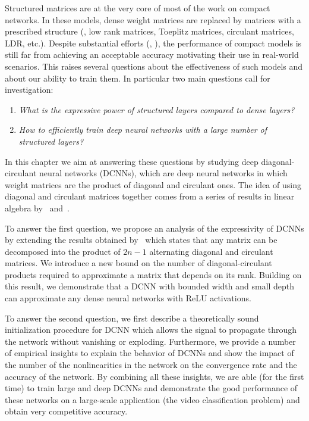 {Structured matrices are at the very core of most of the work on compact networks.
In these models, dense weight matrices are replaced by matrices with a prescribed structure (\eg, low rank matrices, Toeplitz matrices, circulant matrices, LDR, etc.).
Despite substantial efforts  (\eg, \citet{cheng2015exploration,moczulski2016acdc}), the performance of compact models is still far from achieving an acceptable accuracy motivating their use in real-world scenarios.
This raises several questions about the effectiveness of such models and about our ability to train them.
In particular two main questions call for investigation:
\begin{enumerate}
    \item \emph{What is the expressive power of structured layers compared to dense layers?}
    \item \emph{How to efficiently train deep neural networks with a large number of structured layers?}
\end{enumerate}
In this chapter we aim at answering these questions by studying deep diagonal-circulant neural networks (\aka DCNNs), which are deep neural networks in which weight matrices are the product of diagonal and circulant ones.
The idea of using diagonal and circulant matrices together comes from a series of results in linear algebra by~\citet{muller1998algorithmic} and~\citet{huhtanen2015factoring}.

To answer the first question, we propose an analysis of the expressivity of DCNNs by extending the results obtained by~\citet{huhtanen2015factoring} which states that any matrix can be decomposed into the product of $2n-1$ alternating diagonal and circulant matrices.
We introduce a new bound on the number of diagonal-circulant products required to approximate a matrix that depends on its rank.
Building on this result, we demonstrate that a DCNN with bounded width and small depth can approximate any dense neural networks with ReLU activations. 

To answer the second question, we first describe a theoretically sound initialization procedure for DCNN which allows the signal to propagate through the network without vanishing or exploding.
Furthermore, we provide a number of empirical insights to explain the behavior of DCNNs and show the impact of the number of the nonlinearities in the network on the convergence rate and the accuracy of the network. 
By combining all these insights, we are able (for the first time) to train large and deep DCNNs and demonstrate the good performance of these networks on a large-scale application (the \yt video classification problem) and obtain very competitive accuracy. 


}

